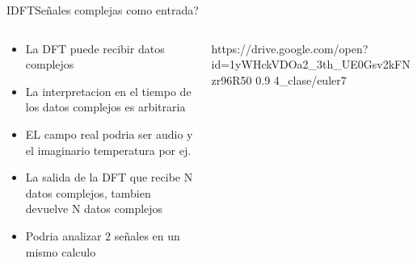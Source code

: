 \begin{frame}{IDFT}{Señales complejas como entrada?}
   \handsonicon
   \footnotesize
   \begin{columns}[c]
      \hspace{2pt}
      \begin{column}{.4\textwidth}
         \begin{itemize}
            \item{La DFT puede recibir datos complejos}
            \item{La interpretacion en el tiempo de los datos complejos es arbitraria}
            \item{EL campo real podria ser audio y el imaginario temperatura por ej.}
            \item{La salida de la DFT que recibe N datos complejos, tambien devuelve N datos complejos}
            \item{Podria analizar 2 señales en un mismo calculo}
         \end{itemize}
      \end{column}
      \hspace{2pt}
      \vrule
      \hspace{2pt}
      \begin{column}{.6\textwidth}
         {https://drive.google.com/open?id=1yWHckVDOa2_3th_UE0Gsv2kFNzr96R50}
         {0.9}
         {4_clase/euler7}
      \end{column}
      \hspace{2pt}
   \end{columns}
   \vfill
\end{frame}

